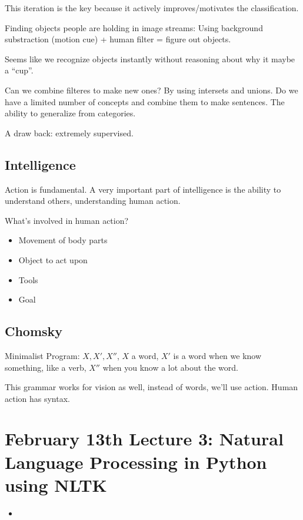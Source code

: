 This iteration is the key because it actively improves/motivates the
classification.

Finding objects people are holding in image streams: Using background
substraction (motion cue) + human filter = figure out objects.

Seems like we recognize objects instantly without reasoning about why
it maybe a ``cup''.

Can we combine filteres to make new ones? By using intersets and
unions. Do we have a limited number of concepts and combine them to
make sentences. The ability to generalize from categories.

A draw back: extremely supervised.

\subsection{Intelligence}
Action is fundamental. A very important part of intelligence is the
ability to understand others, understanding human action.

What's involved in human action? 
\begin{itemize}
\item Movement of body parts
\item Object to act upon
\item Tools
\item Goal
\end{itemize}

\subsection{Chomsky}
\label{sec:chomsky}
Minimalist Program: $X, X', X''$, $X$ a word, $X'$ is a word when we
know something, like a verb, $X''$ when you know a lot about the
word. 

This grammar works for vision as well, instead of words, we'll use
action. Human action has syntax.

\section{February 13th Lecture 3: Natural Language Processing in
  Python using NLTK}
\label{sec:febr-13th-lect}

\begin{itemize}
\item 
\end{itemize}









 
